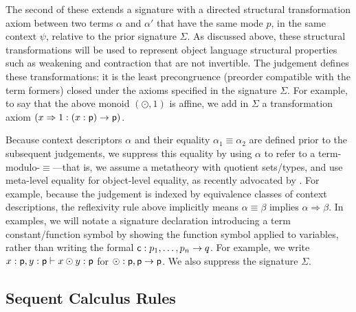 \documentclass[a4paper,USenglish]{lipics-v2016}
\newcommand\deq{\ensuremath{\equiv}}
\newcommand\spr{\ensuremath{\Rightarrow}} %
\newcommand\citet[1]{\cite{#1}}
\begin{document}
The second of these extends a signature with a directed structural
transformation axiom between two terms $\alpha$ and $\alpha'$ that have
the same mode $p$, in the same context $\psi$, relative to the prior
signature $\Sigma$.  As discussed above, these structural
transformations will be used to represent object language structural
properties such as weakening and contraction that are not invertible.
The judgement  defines these
transformations: it is the least precongruence (preorder compatible with
the term formers) closed under the axioms specified in the signature
$\Sigma$.  For example, to say that the above monoid $(\odot,1)$ is
affine, we add in $\Sigma$ a transformation axiom $(x \spr 1 : (x:\dsd{p}) \to
{\dsd{p}})$.

Because context descriptors $\alpha$ and their equality $\alpha_1 \deq
\alpha_2$ are defined prior to the subsequent judgements, we suppress
this equality by using $\alpha$ to refer to a term-modulo-\deq---that
is, we assume a metatheory with quotient sets/types, and use meta-level
equality for object-level equality, as recently advocated by
\citet{altenkirchkaposi16qit}.  For example, because the judgement
 is indexed by equivalence classes of
context descriptions, the reflexivity rule above implicitly means
$\alpha \deq \beta$ implies $\alpha \spr \beta$.  In examples, we will
notate a signature declaration introducing a term constant/function
symbol by showing the function symbol applied to variables, rather than
writing the formal $\mathsf{c} : p_1,\ldots,p_n \to q$. For example, we
write $x : \mathsf{p}, y : \mathsf{p} \vdash x \odot y : \mathsf{p}$ for $\odot :
\mathsf{p},\mathsf{p} \to \mathsf{p}$.  We also suppress the signature $\Sigma$.

\subsection{Sequent Calculus Rules}
\end{document}
